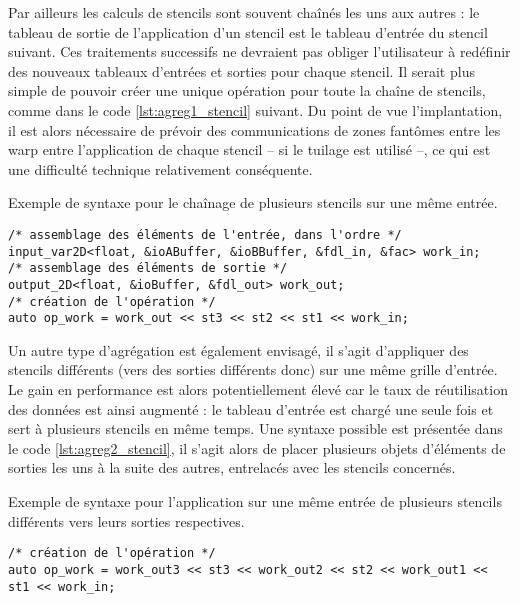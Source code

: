Par ailleurs les calculs de stencils sont souvent chaînés les uns aux autres : le tableau de sortie de l'application d'un stencil est le tableau d'entrée du stencil suivant. Ces traitements successifs ne devraient pas obliger l'utilisateur à redéfinir des nouveaux tableaux d'entrées et sorties pour chaque stencil. Il serait plus simple de pouvoir créer une unique opération pour toute la chaîne de stencils, comme dans le code \ref{lst:agreg1_stencil} suivant. Du point de vue l'implantation, il est alors nécessaire de prévoir des communications de zones fantômes entre les warp entre l'application de chaque stencil -- si le tuilage est utilisé --, ce qui est une difficulté technique relativement conséquente.

\begin{listing}[H]
\caption{Exemple de syntaxe pour le chaînage de plusieurs stencils sur une même entrée.}
\label{lst:agreg1_stencil}
\begin{verbatim}
/* assemblage des éléments de l'entrée, dans l'ordre */
input_var2D<float, &ioABuffer, &ioBBuffer, &fdl_in, &fac> work_in;
/* assemblage des éléments de sortie */
output_2D<float, &ioBuffer, &fdl_out> work_out;
/* création de l'opération */
auto op_work = work_out << st3 << st2 << st1 << work_in;
\end{verbatim}
\end{listing}

Un autre type d'agrégation est également envisagé, il s'agit d'appliquer des stencils différents (vers des sorties différents donc) sur une même grille d'entrée. Le gain en performance est alors potentiellement élevé car le taux de réutilisation des données est ainsi augmenté : le tableau d'entrée est chargé une seule fois et sert à plusieurs stencils en même temps. Une syntaxe possible est présentée dans le code \ref{lst:agreg2_stencil}, il s'agit alors de placer plusieurs objets d'éléments de sorties les uns à la suite des autres, entrelacés avec les stencils concernés. 

\begin{listing}[H]
\caption{Exemple de syntaxe pour l'application sur une même entrée de plusieurs stencils différents vers leurs sorties respectives.}
\label{lst:agreg2_stencil}
\begin{verbatim}
/* création de l'opération */
auto op_work = work_out3 << st3 << work_out2 << st2 << work_out1 << st1 << work_in;
\end{verbatim}
\end{listing}


